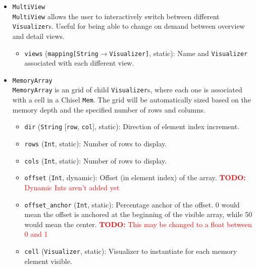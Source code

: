 \documentclass[11pt]{article}
\newcommand{\todo}[1]{\textcolor{red}{\textbf{TODO:} #1}}
\begin{document}
\begin{itemize}
  \todo{Add a picture to describe this concept}
  \begin{itemize}
    \item \texttt{dir} (\texttt{String} [\texttt{row}, \texttt{col}], static): Whether cells are arranged left to right (\texttt{row}) or top to bottom (\texttt{col}).
    \item \texttt{cells} (\texttt{list[Visualizer]}, static): Children \texttt{Visualizer}s to arrange in a line.
  \end{itemize}  
  \item \texttt{MultiView} \\
  \texttt{MultiView} allows the user to interactively switch between different \texttt{Visualizer}s. Useful for being able to change on demand between overview and detail views.
  \begin{itemize}
    \item \texttt{views} (\texttt{mapping[String$\rightarrow$Visualizer]}, static): Name and \texttt{Visualizer} associated with each different view.
  \end{itemize}
  \item \texttt{MemoryArray} \\
  \texttt{MemoryArray} is an grid of child \texttt{Visualizer}s, where each one is associated with a cell in a Chisel \texttt{Mem}. The grid will be automatically sized based on the memory depth and the specified number of rows and columns.
  \begin{itemize}
    \item \texttt{dir} (\texttt{String} [\texttt{row}, \texttt{col}], static): Direction of element index increment.
    \item \texttt{rows} (\texttt{Int}, static): Number of rows to display.
    \item \texttt{cols} (\texttt{Int}, static): Number of rows to display.
    \item \texttt{offset} (\texttt{Int}, dynamic): Offset (in element index) of the array. \todo{Dynamic Ints aren't added yet}
    \item \texttt{offset\_anchor} (\texttt{Int}, static): Percentage anchor of the offset. 0 would mean the offset is anchored at the beginning of the visible array, while 50 would mean the center. \todo{This may be changed to a float between 0 and 1}
    \item \texttt{cell} (\texttt{Visualizer}, static): Visualizer to instantiate for each memory element visible.
  \end{itemize}
\end{itemize}
\end{document}
